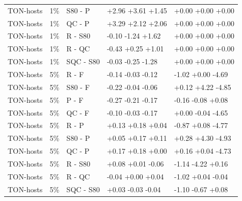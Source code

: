 \documentclass[10pt]{article}
\begin{document}
{\begin{longtable}{lllll}
TON-hosts & 1\% & S80 - P & +2.96 +3.61 +1.45 & +0.00 +0.00 +0.00 \\
TON-hosts & 1\% & QC - P & +3.29 +2.12 +2.06 & +0.00 +0.00 +0.00 \\
TON-hosts & 1\% & R - S80 & -0.10 -1.24 +1.62 & +0.00 +0.00 +0.00 \\
TON-hosts & 1\% & R - QC & -0.43 +0.25 +1.01 & +0.00 +0.00 +0.00 \\
TON-hosts & 1\% & SQC - S80 & -0.03 -0.25 -1.28 & +0.00 +0.00 +0.00 \\
TON-hosts & 5\% & R - F & -0.14 -0.03 -0.12 & -1.02 +0.00 -4.69 \\
TON-hosts & 5\% & S80 - F & -0.22 -0.04 -0.06 & +0.12 +4.22 -4.85 \\
TON-hosts & 5\% & P - F & -0.27 -0.21 -0.17 & -0.16 -0.08 +0.08 \\
TON-hosts & 5\% & QC - F & -0.10 -0.03 -0.17 & +0.00 -0.04 -4.65 \\
TON-hosts & 5\% & R - P & +0.13 +0.18 +0.04 & -0.87 +0.08 -4.77 \\
TON-hosts & 5\% & S80 - P & +0.05 +0.17 +0.11 & +0.28 +4.30 -4.93 \\
TON-hosts & 5\% & QC - P & +0.17 +0.18 +0.00 & +0.16 +0.04 -4.73 \\
TON-hosts & 5\% & R - S80 & +0.08 +0.01 -0.06 & -1.14 -4.22 +0.16 \\
TON-hosts & 5\% & R - QC & -0.04 +0.00 +0.04 & -1.02 +0.04 -0.04 \\
TON-hosts & 5\% & SQC - S80 & +0.03 -0.03 -0.04 & -1.10 -0.67 +0.08 \\
\end{longtable}}
\end{document}

